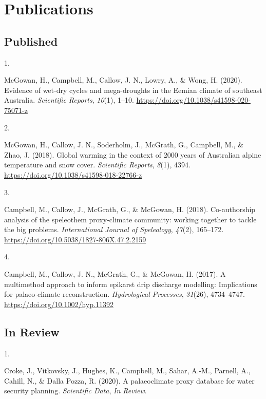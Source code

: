 \documentclass[11pt,a4paper,]{moderncv}
\newlength{\csllabelwidth}
\newcommand{\CSLLeftMargin}[1]{\parbox[t]{\csllabelwidth}{#1}}
\newcommand{\CSLRightInline}[1]{\parbox[t]{\linewidth - \csllabelwidth}{#1}}
\begin{document}
\hypertarget{publications}{%
\section{Publications}\label{publications}}

\hypertarget{published}{%
\subsection{Published}\label{published}}

\hypertarget{bibliography}{}
\leavevmode\hypertarget{ref-mcgowan_evidence_2020}{}%
\CSLLeftMargin{1. }
\CSLRightInline{McGowan, H., Campbell, M., Callow, J. N., Lowry, A., \&
Wong, H. (2020). Evidence of wet-dry cycles and mega-droughts in the
Eemian climate of southeast Australia. \emph{Scientific Reports},
\emph{10}(1), 1--10. \url{https://doi.org/10.1038/s41598-020-75071-z}}

\leavevmode\hypertarget{ref-McGowan2018}{}%
\CSLLeftMargin{2. }
\CSLRightInline{McGowan, H., Callow, J. N., Soderholm, J., McGrath, G.,
Campbell, M., \& Zhao, J. (2018). Global warming in the context of 2000
years of Australian alpine temperature and snow cover. \emph{Scientific
Reports}, \emph{8}(1), 4394.
\url{https://doi.org/10.1038/s41598-018-22766-z}}

\leavevmode\hypertarget{ref-Campbell2018}{}%
\CSLLeftMargin{3. }
\CSLRightInline{Campbell, M., Callow, J., McGrath, G., \& McGowan, H.
(2018). Co-authorship analysis of the speleothem proxy-climate
community: working together to tackle the big problems.
\emph{International Journal of Speleology}, \emph{47}(2), 165--172.
\url{https://doi.org/10.5038/1827-806X.47.2.2159}}

\leavevmode\hypertarget{ref-Campbell2017}{}%
\CSLLeftMargin{4. }
\CSLRightInline{Campbell, M., Callow, J. N., McGrath, G., \& McGowan, H.
(2017). A multimethod approach to inform epikarst drip discharge
modelling: Implications for palaeo-climate reconstruction.
\emph{Hydrological Processes}, \emph{31}(26), 4734--4747.
\url{https://doi.org/10.1002/hyp.11392}}

\newpage

\hypertarget{in-review}{%
\subsection{In Review}\label{in-review}}

\hypertarget{bibliography}{}
\leavevmode\hypertarget{ref-Croke2020}{}%
\CSLLeftMargin{1. }
\CSLRightInline{Croke, J., Vitkovsky, J., Hughes, K., Campbell, M.,
Sahar, A.-M., Parnell, A., Cahill, N., \& Dalla Pozza, R. (2020). A
palaeoclimate proxy database for water security planning.
\emph{Scientific Data}, \emph{In Review}.}
\end{document}
